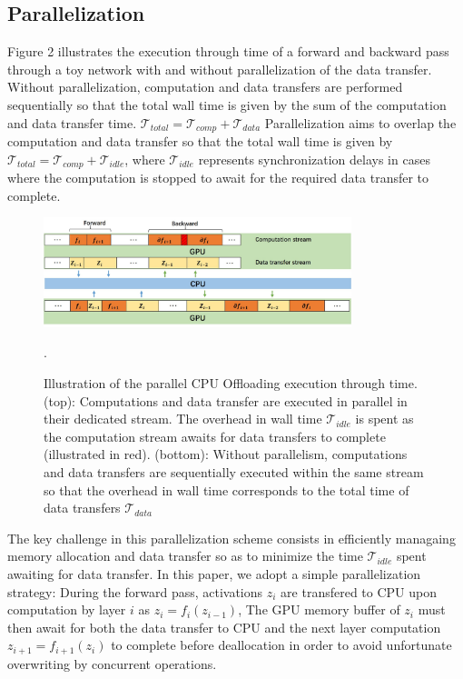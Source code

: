 \documentclass[11pt,onecolumn]{article}
\begin{document}
\subsection{Parallelization}

Figure 2 illustrates the execution through time of a forward 
and backward pass through a toy network with and without parallelization of the data transfer.
Without parallelization, computation and data transfers are performed sequentially 
so that the total wall time is given by the sum of the computation and data transfer time.
$\mathcal{T}_{total} = \mathcal{T}_{comp} + \mathcal{T}_{data}$
Parallelization aims to overlap the computation and data transfer so that the total wall time is given by
$\mathcal{T}_{total} = \mathcal{T}_{comp} + \mathcal{T}_{idle}$, where $\mathcal{T}_{idle}$ represents synchronization delays in cases where the computation is stopped to await for the required data transfer to complete.

\begin{figure}[h!]
\centering
\includegraphics[width=0.8\textwidth]{Figure2.jpg}
\caption{Illustration of the parallel CPU Offloading execution through time.
(top): Computations and data transfer are executed in parallel in their dedicated stream. 
The overhead in wall time $\mathcal{T}_{idle}$ is spent as the computation stream awaits 
for data transfers to complete (illustrated in red). 
(bottom): Without parallelism, computations and data transfers are sequentially executed within the same stream
so that the overhead in wall time corresponds to the total time of data transfers $\mathcal{T}_{data}$}.
\end{figure}


The key challenge in this parallelization scheme consists in efficiently
managaing memory allocation and data transfer so as to
minimize the time $\mathcal{T}_{idle}$ spent awaiting for data transfer.
In this paper, we adopt a simple parallelization strategy:
During the forward pass, activations $z_i$ are transfered to CPU 
upon computation by layer $i$ as $z_i = f_i(z_{i-1})$,
The GPU memory buffer of $z_i$ must then await for both the data transfer to CPU and
the next layer computation $z_{i+1} = f_{i+1}(z_{i})$ to complete before deallocation in order to
avoid unfortunate overwriting by concurrent operations.
\end{document}
